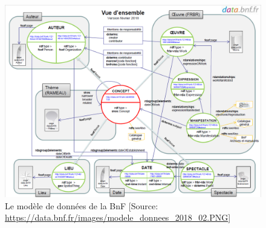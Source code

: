 \begin{figure}[!h]
	\centering
	\includegraphics[width=15cm]{images/mdd_bnf.PNG}
	\caption[Le modèle de données de la BnF]{Le modèle de données de la BnF [Source: \url{https://data.bnf.fr/images/modele_donnees_2018_02.PNG}]}
	\label{mdd_bnf}
\end{figure}